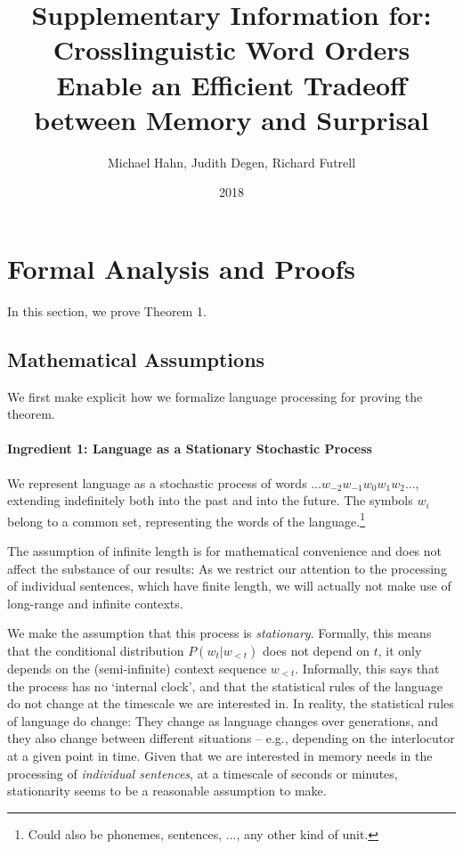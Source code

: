 \documentclass[11pt,letterpaper]{article}
\title{Supplementary Information for: Crosslinguistic Word Orders Enable an Efficient Tradeoff between Memory and Surprisal}
\author{Michael Hahn, Judith Degen, Richard Futrell}
\date{2018}
\newcounter{theorem}
\begin{document}
\maketitle




%
%
%


\section{Formal Analysis and Proofs}

In this section, we prove Theorem 1.

\subsection{Mathematical Assumptions}

We first make explicit how we formalize language processing for proving the theorem.


\paragraph{Ingredient 1: Language as a Stationary Stochastic Process}
We represent language as a stochastic process of words $\dots w_{-2} w_{-1} w_0 w_{1} w_{2} \dots$, extending indefinitely both into the past and into the future.
The symbols $w_i$ belong to a common set, representing the words of the language.\footnote{Could also be phonemes, sentences, ..., any other kind of unit.}


The assumption of infinite length is for mathematical convenience and does not affect the substance of our results:
As we restrict our attention to the processing of individual sentences, which have finite length, we will actually not make use of long-range and infinite contexts.

We make the assumption that this process is \emph{stationary}.
Formally, this means that the conditional distribution $P(w_t|w_{<t})$ does not depend on $t$, it only depends on the (semi-infinite) context sequence $w_{<t}$.
Informally, this says that the process has no `internal clock', and that the statistical rules of the language do not change at the timescale we are interested in.
In reality, the statistical rules of language do change: They change as language changes over generations, and they also change between different situations -- e.g., depending on the interlocutor at a given point in time.
Given that we are interested in memory needs in the processing of \emph{individual sentences}, at a timescale of seconds or minutes, stationarity seems to be a reasonable assumption to make.
\end{document}
